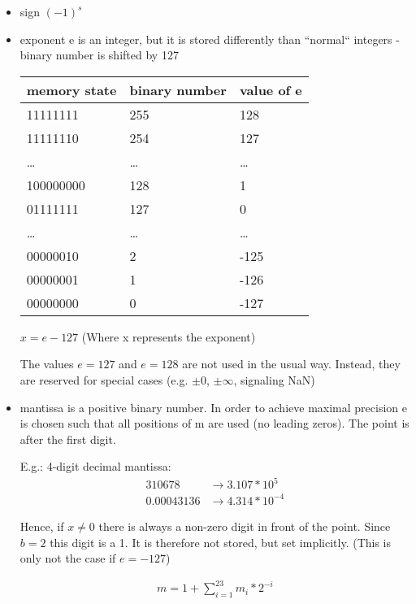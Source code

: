 \begin{itemize}
    \item sign $(-1)^s$
    \item exponent e is an integer, but it is stored differently than ``normal`` integers - binary number is shifted by 127

    \begin{tabular}{l l l}
        \toprule
        memory state & binary number & value of e \\
        \midrule
        11111111     & 255           & 128        \\
        11111110     & 254           & 127        \\
        \ldots       & \ldots        & \ldots     \\
        100000000    & 128           & 1          \\
        01111111     & 127           & 0          \\
        \ldots       & \ldots        & \ldots     \\
        00000010     & 2             & -125       \\
        00000001     & 1             & -126       \\
        00000000     & 0             & -127       \\
        \bottomrule
    \end{tabular}

    $x = e-127$ (Where x represents the exponent)

    The values $e = 127$ and $e = 128$ are not used in the usual way.
    Instead, they are reserved for special cases (e.g. $\pm 0$, $ \pm \infty$, signaling NaN)
    \item mantissa is a positive binary number.
    In order to achieve maximal precision e is chosen such that all positions of m are used (no leading zeros).
    The point is after the first digit.

    E.g.: 4-digit decimal mantissa:
    \begin{align*}
        310678 &\rightarrow 3.107 * 10^5 \\
        0.00043136 &\rightarrow 4.314 * 10^{-4}
    \end{align*}

    Hence, if $x \neq 0$ there is always a non-zero digit in front of the point.
    Since $b = 2$ this digit is a 1.
    It is therefore not stored, but set implicitly.
    (This is only not the case if $e=-127$)

    \begin{align*}
        m = 1 + \sum_{i = 1}^{23} m_i * 2^{-i}
    \end{align*}
\end{itemize}

